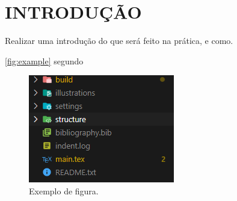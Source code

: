 \section{INTRODUÇÃO} \label{sec:introducao}

Realizar uma introdução do que será feito na prática, e como.

\autoref{fig:example} segundo 

\begin{figure}[H]
	\centering
	\caption{Exemplo de figura.}
	\label{fig:example}
	\includegraphics[width=0.5\linewidth]{illustrations/figures/example.png}
\end{figure}

